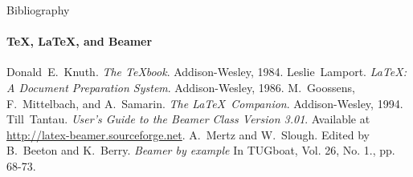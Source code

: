 \documentclass{beamer}
\begin{document}
\begin{darkframes}
      \begin{frame}[label=bibliography]{Bibliography}
         \framesubtitle{\TeX, \LaTeX, and Beamer}
         \begin{thebibliography}{9}
                  Donald~E.~Knuth.
                  \emph{The \TeX book}.
                  Addison-Wesley, 1984.
                  Leslie~Lamport.
                  \emph{\LaTeX : A Document Preparation System}.
                  Addison-Wesley, 1986.
                  M.~Goossens, F.~Mittelbach, and A.~Samarin.
                  \emph{The \LaTeX\ Companion}.
                  Addison-Wesley, 1994.
                  Till~Tantau.
                  \emph{User's Guide to the Beamer Class Version 3.01}.
                  Available at \url{http://latex-beamer.sourceforge.net}.
                  A.~Mertz and W.~Slough.
                  Edited by B.~Beeton and K.~Berry.
                  \emph{Beamer by example} In TUGboat,
                     Vol. 26, No. 1., pp. 68-73.
         \end{thebibliography}
      \end{frame}

   \end{darkframes}
\end{document}
